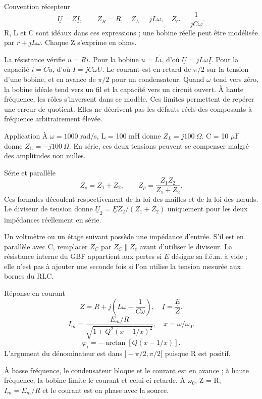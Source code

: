 \begin{loi}{Convention récepteur}
\[\underline U=Z\underline I,\qquad Z_R=R,\quad Z_L=jL\omega,\quad Z_C=\frac1{jC\omega}.\]R, L et C sont idéaux dans ces expressions ; une bobine réelle peut être modélisée par $r+jL\omega$. Chaque Z s’exprime en ohms.
\end{loi}
La résistance vérifie $u=Ri$. Pour la bobine $u=L\dot i$, d’où $\underline U=jL\omega\underline I$. Pour la capacité $i=C\dot u$, d’où $\underline I=jC\omega\underline U$. Le courant est en retard de $\pi/2$ sur la tension d’une bobine, et en avance de $\pi/2$ pour un condensateur.
Quand $\omega$ tend vers zéro, la bobine idéale tend vers un fil et la capacité vers un circuit ouvert. À haute fréquence, les rôles s’inversent dans ce modèle. Ces limites permettent de repérer une erreur de quotient. Elles ne décrivent pas les défauts réels des composants à fréquence arbitrairement élevée.
\begin{docu}{Application}
À $\omega=1000$ rad/s, L = 100 mH donne $Z_L=j100\ \Omega$. C = 10 $\mu\mathrm F$ donne $Z_C=-j100\ \Omega$. En série, ces deux tensions peuvent se compenser malgré des amplitudes non nulles.
\end{docu}


\begin{loi}{Série et parallèle}
\[Z_s=Z_1+Z_2,\qquad Z_p=\frac{Z_1Z_2}{Z_1+Z_2}.\]Ces formules découlent respectivement de la loi des mailles et de la loi des nœuds. Le diviseur de tension donne $\underline U_2=\underline E Z_2/(Z_1+Z_2)$ uniquement pour les deux impédances réellement en série.
\end{loi}
Un voltmètre ou un étage suivant possède une impédance d’entrée. S’il est en parallèle avec C, remplacer $Z_C$ par $Z_C\parallel Z_e$ avant d’utiliser le diviseur. La résistance interne du GBF appartient aux pertes si $\underline E$ désigne sa f.é.m. à vide ; elle n’est pas à ajouter une seconde fois si l’on utilise la tension mesurée aux bornes du RLC.


\begin{loi}{Réponse en courant}
\[Z=R+j\left(L\omega-\frac1{C\omega}\right),\quad \underline I=\frac{\underline E}{Z}.\]\[I_m=\frac{E_m/R}{\sqrt{1+Q^2(x-1/x)^2}},\quad x=\omega/\omega_0.\]\[\varphi_i=-\arctan[Q(x-1/x)].\]L’argument du dénominateur est dans $]-\pi/2,\pi/2[$ puisque R est positif.
\end{loi}
À basse fréquence, le condensateur bloque et le courant est en avance ; à haute fréquence, la bobine limite le courant et celui-ci retarde. À $\omega_0$, Z = R, $I_m=E_m/R$ et le courant est en phase avec la source.


